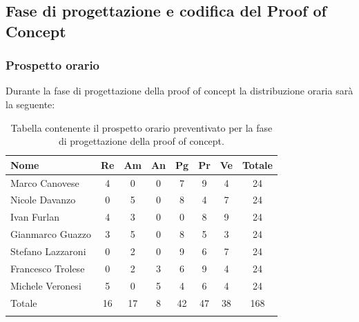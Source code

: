 \subsection{Fase di progettazione e codifica del Proof of Concept}
\subsubsection{Prospetto orario}
Durante la fase di progettazione della proof of concept la distribuzione oraria sarà la seguente:

\begin{longtable}{|l|c|c|c|c|c|c|c|}
	\hline
	\rowcolor{lighter-grayer}
	\textbf{Nome}     & \textbf{Re} & \textbf{Am} & \textbf{An} & \textbf{Pg} & \textbf{Pr} & \textbf{Ve} & \textbf{Totale} \\
	\hline
	\endfirsthead

	\hline
	Marco Canovese    & 4           & 0           & 0           & 7           & 9           & 4           & 24              \\
	\hline
	\hline
	Nicole Davanzo    & 0           & 5           & 0           & 8           & 4           & 7           & 24              \\
	\hline
	\hline
	Ivan Furlan       & 4           & 3           & 0           & 0           & 8           & 9           & 24              \\
	\hline
	\hline
	Gianmarco Guazzo  & 3           & 5           & 0           & 8           & 5           & 3           & 24              \\
	\hline
	\hline
	Stefano Lazzaroni & 0           & 2           & 0           & 9           & 6           & 7           & 24              \\
	\hline
	\hline
	Francesco Trolese & 0           & 2           & 3           & 6           & 9           & 4           & 24              \\
	\hline
	\hline
	Michele Veronesi  & 5           & 0           & 5           & 4           & 6           & 4           & 24              \\
	\hline
	\hline
	Totale            & 16          & 17          & 8           & 42          & 47          & 38          & 168             \\
	\hline
	\rowcolor{white}
	\caption{Tabella contenente il prospetto orario preventivato per la fase di progettazione della proof of concept.}
\end{longtable}


